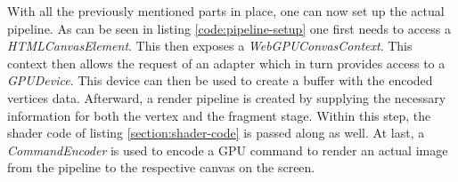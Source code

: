 With all the previously mentioned parts in place, one can now set up the actual pipeline. As can be seen in listing \ref*{code:pipeline-setup} one first needs to access a \emph{HTMLCanvasElement}. This 
then exposes a \emph{WebGPUConvasContext}. This context then allows the request of an adapter which in turn provides access to a \emph{GPUDevice}.
This device can then be used to create a buffer with the encoded vertices data. Afterward, a render pipeline is created by supplying the necessary information for both the vertex and the fragment stage.
Within this step, the shader code of listing \ref*{section:shader-code} is passed along as well. At last, a \emph{CommandEncoder} is used to encode a GPU command to render an actual image from the pipeline to the respective canvas on the screen. 

\begin{samepage}
  
    {
      An exemplary illustration of how to set up a WebGPU pipeline
    }},
    language=TypeScript,
    firstnumber=11,
    label=code:pipeline-setup
    ]
    {listings/main.ts}
\end{samepage}